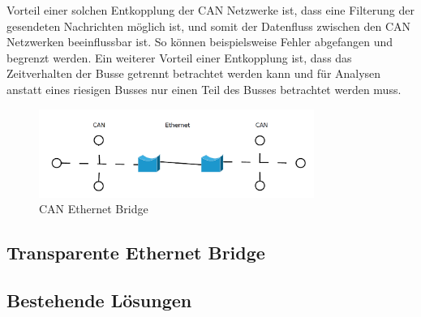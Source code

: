 Vorteil einer solchen Entkopplung der CAN Netzwerke ist, dass eine Filterung der gesendeten Nachrichten möglich ist, und somit der Datenfluss zwischen den CAN Netzwerken beeinflussbar ist. So können beispielsweise Fehler abgefangen und begrenzt werden. Ein weiterer Vorteil einer Entkopplung ist, dass das Zeitverhalten der Busse getrennt betrachtet werden kann und für Analysen anstatt eines riesigen Busses nur einen Teil des Busses betrachtet werden muss.

\begin{figure}[h] 
\centering
\includegraphics[width=0.8\textwidth]{figures/can_bridge}
\caption{CAN Ethernet Bridge} 
\label{bridge}
\end{figure} 

\subsection{Transparente Ethernet Bridge}
	
\subsection{Bestehende Lösungen}



\newpage {} \listoffigures

\newpage {}
% 


